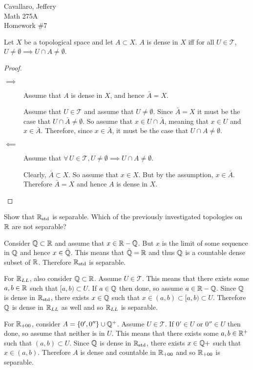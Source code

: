\documentclass[letterpaper,12pt,fleqn]{article}
\newcommand{\T}{\mathscr{T}}
\newcommand{\Rs}{\R_{\text{std}}}
\newcommand{\RL}{\R_{LL}}
\newcommand{\RZ}{\R_{+00}}
\begin{document}
Cavallaro, Jeffery \\
Math 275A \\
Homework \#7

\bigskip

\begin{theorem}[5.1]
  Let \(X\) be a topological space and let \(A\subset X\).  \(A\) is dense in \(X\) iff for all \(U\in\T\),
  \(U\ne\emptyset\implies U\cap A\ne\emptyset\).
\end{theorem}

\begin{proof}
  \begin{description}
  \item[]
  \item[\(\implies\)] Assume that \(A\) is dense in \(X\), and hence \(\bar{A}=X\).

    Assume that \(U\in\T\) and assume that \(U\ne\emptyset\).  Since \(\bar{A}=X\) it must be the case that
    \(U\cap\bar{A}\ne\emptyset\).  So assume that \(x\in U\cap\bar{A}\), meaning that \(x\in U\) and
    \(x\in\bar{A}\).  Therefore, since \(x\in\bar{A}\), it must be the case that \(U\cap A\ne\emptyset\).

  \item[\(\impliedby\)] Assume that \(\forall\,U\in\T,U\ne\emptyset\implies U\cap A\ne\emptyset\).

    Clearly, \(\bar{A}\subset X\).  So assume that \(x\in X\).  But by the assumption, \(x\in\bar{A}\).
    Therefore \(\bar{A}=X\) and hence \(A\) is dense in \(X\).
  \end{description}
\end{proof}

\begin{example}[Exercise 5.2]
  Show that \(\Rs\) is separable.  Which of the previously investigated topologies on \(\mathbb{R}\) are not separable?

  Consider \(\mathbb{Q}\subset\mathbb{R}\) and assume that \(x\in\mathbb{R}-\mathbb{Q}\).  But \(x\) is the limit of some sequence in \(\mathbb{Q}\) and
  hence \(x\in\bar{\mathbb{Q}}\).  This means that \(\bar{\mathbb{Q}}=\mathbb{R}\) and thus \(\mathbb{Q}\) is a countable dense subset of \(\mathbb{R}\).
  Therefore \(\Rs\) is separable.

  For \(\RL\), also consider \(\mathbb{Q}\subset\mathbb{R}\).  Assume \(U\in\T\).  This means that there exists some \(a,b\in\mathbb{R}\)
  such that \([a,b)\subset U\).  If \(a\in\mathbb{Q}\) then done, so assume \(a\in\mathbb{R}-\mathbb{Q}\).  Since \(\mathbb{Q}\) is dense in
  \(\Rs\), there exists \(x\in\mathbb{Q}\) such that \(x\in(a,b)\subset[a,b)\subset U\).  Therefore \(\mathbb{Q}\) is dense in
  \(\RL\) as well and so \(\RL\) is separable.

  For \(\RZ\), consider \(A=\{0',0''\}\cup\mathbb{Q}^+\).  Assume \(U\in\T\).  If \(0'\in U\) or \(0''\in U\) then done,
  so assume that neither is in \(U\).  This means that there exists some \(a,b\in\mathbb{R}^+\) such that \((a,b)\subset U\).
  Since \(\mathbb{Q}\) is dense in \(\Rs\), there exists \(x\in\mathbb{Q}+\) such that \(x\in(a,b)\).  Therefore \(A\) is dense
  and countable in \(\RZ\) and so \(\RZ\) is separable.
\end{example}
\end{document}
